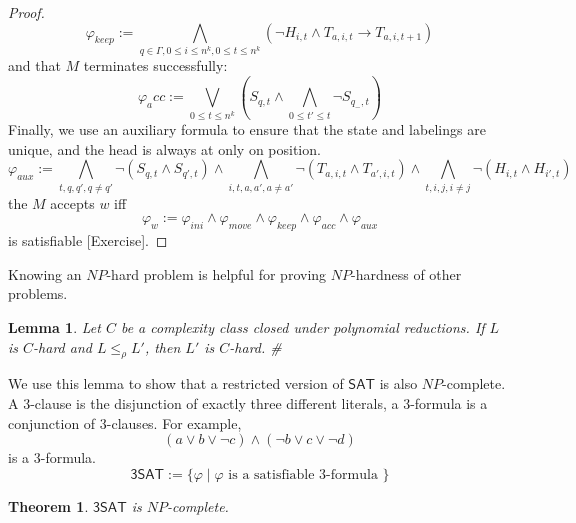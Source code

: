 \documentclass{report}
\newtheorem{theorem}[definition]{Theorem}
\newtheorem{lemma}[definition]{Lemma}
\begin{document}
\begin{proof}
\[
\varphi_{keep} := \bigwedge_{q\in\Gamma,0\leq i \leq n^k, 0\leq t \leq n^k}(\neg H_{i,t} \land T_{a,i,t} \rightarrow T_{a,i,t+1})
\]
and that $M$ terminates successfully:
\[
\varphi_acc := \bigvee_{0\leq t\leq n^k}(S_{q,t} \land \bigwedge_{0\leq t'\leq t}\neg S_{q_-,t})
\]
Finally, we use an auxiliary formula to ensure that the state and labelings are unique, and the head is always at only on position.
\[
\varphi_{aux} := \bigwedge_{t,q,q',q\neq q'}\neg(S_{q,t} \land S_{q',t}) \land \bigwedge_{i,t,a,a',a\neq a'}\neg (T_{a,i,t} \land T_{a',i,t}) \land \bigwedge_{t,i,j,i\neq j}\neg (H_{i,t} \land H_{i',t})
\]
the $M$ accepts $w$ iff
\[\varphi_w := \varphi_{ini} \land \varphi_{move} \land \varphi_{keep} \land \varphi_{acc} \land \varphi_{aux}\]
is satisfiable [Exercise].
\end{proof}

Knowing an $NP$-hard problem is helpful for proving $NP$-hardness of other problems.

\begin{lemma}Let $C$ be a complexity class closed under polynomial reductions. If $L$ is $C$-hard and $L \leq_\rho L'$, then $L'$ is $C$-hard. \#
\end{lemma}\noindent
We use this lemma to show that a restricted version of $\mathsf{SAT}$ is also $NP$-complete. A $3$-clause is the disjunction of exactly three different literals, a $3$-formula is a conjunction of $3$-clauses. For example, 
\[ (a \lor b \lor \neg c) \land (\neg b \lor c \lor \neg d)\]
is a $3$-formula.
\[  \mathsf{3SAT} := \{ \varphi\;|\;\varphi \text{ is a satisfiable 3-formula }\} \]

\begin{theorem}$\mathsf{3SAT}$ is $NP$-complete.
\end{theorem}
\end{document}
